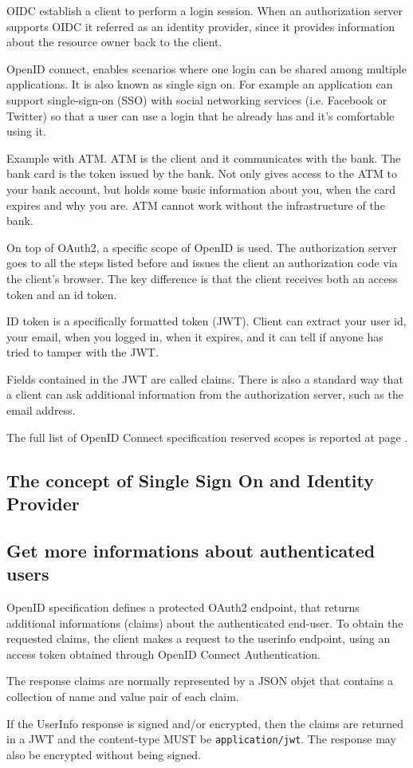 OIDC establish a client to perform a login session.
When an authorization server supports OIDC it referred as an identity provider,
since it provides information about the resource owner back to the client.

OpenID connect, enables scenarios where one login can be shared among multiple
applications. It is also known as single sign on.
For example an application can support single-sign-on (SSO) with social networking services (i.e.
Facebook or Twitter) so that a user can use a login that he already has and it's
comfortable using it.

Example with ATM. ATM is the client and it communicates with the bank. The bank
card is the token issued by the bank. Not only gives access to the ATM to your
bank account, but holds some basic information about you, when the card expires
and why you are.
ATM cannot work without the infrastructure of the bank.

On top of OAuth2, a specific scope of OpenID is used. The authorization server
goes to all the steps listed before and issues the client an authorization code
via the client's browser.
The key difference is that the client receives both an access token and an id
token.

ID token is a specifically formatted token (JWT). Client can extract your user
id, your email, when you logged in, when it expires, and it can tell if anyone
has tried to tamper with the JWT.

Fields contained in the JWT are called claims.
There is also a standard way that a client can ask additional information from the
authorization server, such as the email address.

The full list of OpenID Connect specification reserved scopes is reported at
page \pageref{openid}.

\subsection{The concept of Single Sign On and Identity Provider}
\subsection{Get more informations about authenticated users}
OpenID specification defines a protected OAuth2 endpoint, that returns
additional informations (claims) about the authenticated end-user.
To obtain the requested claims, the client makes a request to the userinfo
endpoint, using an access token obtained through OpenID Connect
Authentication.

The response claims are normally represented by a JSON objet that contains a
collection of name and value pair of each claim.

If the UserInfo response is signed and/or encrypted, then the claims are
returned in a JWT and the content-type MUST be \texttt{application/jwt}.
The response may also be encrypted without being signed.


